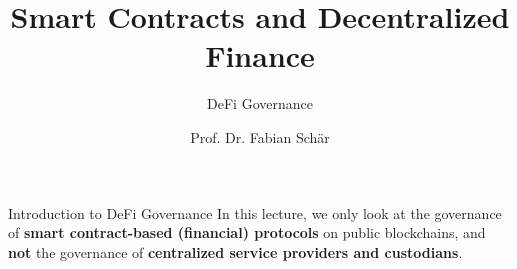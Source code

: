 \documentclass[]{beamer}
\title{Smart Contracts and Decentralized Finance}
\subtitle{DeFi Governance}
\author{Prof. Dr. Fabian Schär}
\institute{University of Basel}
\begin{document}
\thispagestyle{empty}
\begin{frame}[noframenumbering]
	\titlepage
\end{frame}

\begin{frame}{Introduction to DeFi Governance}
	In this lecture, we only look at the governance of \textbf{smart contract-based (financial) protocols} on public blockchains, and \textbf{not} the governance of \textbf{centralized service providers and custodians}.\\
	
	\vspace{1em}
	
\end{frame}
\end{document}
